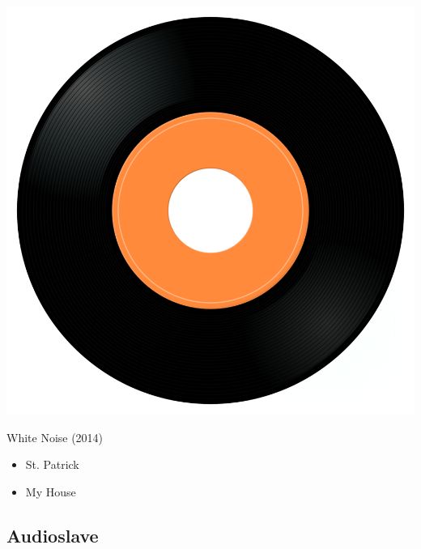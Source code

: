 \begin{minipage}[t]{0.25\textwidth}
\captionsetup{type=figure}
\includegraphics[width=\textwidth]{Images/cover.png}
\caption*{White Noise (2014)}
\end{minipage}
\begin{minipage}[t]{0.25\textwidth}\vspace{0pt}
\begin{itemize}[nosep,leftmargin=1em,labelwidth=*,align=left]
	\setlength{\itemsep}{0pt}
	\item St. Patrick 
	\item My House
\end{itemize}
\end{minipage}

\subsection{Audioslave}


